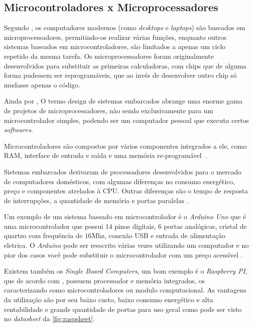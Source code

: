 \subsection{Microcontroladores x Microprocessadores}
\label{Sect:Micros}


Segundo , os computadores modernos (como \textit{desktops} e \textit{laptops}) são baseados em microprocessadores, permitindo-os realizar várias funções, enquanto outros sistemas baseados em microcontroladores, são limitados a apenas um ciclo repetido da mesma tarefa. Os microprocessadores foram originalmente desenvolvidos para substituir as primeiras calculadoras, com chips que de alguma forma pudessem ser reprogramáveis, que ao invés de desenvolver outro chip só mudasse apenas o código.

Ainda por , O termo design de sistemas embarcados abrange uma enorme gama de projetos de microprocessadores, não sendo exclusivamente para um microcontrolador simples, podendo ser um computador pessoal que executa certos \textit{softwares}.\par Microcontroladores são compostos por vários componentes integrados a ele, como RAM, interface de entrada e saída e uma memória re-programável~\cite{white:2011}.


Sistemas embarcados derivaram de processadores desenvolvidos para o mercado de computadores domésticos, com algumas diferenças no consumo energético, preço e componentes atrelados à CPU. Outras diferenças são o tempo de resposta de interrupções, a quantidade de memória e portas paralelas \cite{schlett:1998}.

Um exemplo de um sistema baseado em microcontrolador é o \textit{Arduino Uno} \cite{Arduino2018ArduinoRev3} que é uma microcontrolador que possui $14$ pinos digitais, $6$ portas analógicas, cristal de quartzo com frequência de $16$Mhz, conexão USB e entrada de alimentação eletrica. O \textit{Arduino} pode ser reescrito várias vezes utilizando um computador e no pior dos casos você pode substituir o microcontrolador com um preço acessível \cite{Arduino2018ArduinoRev3}.


Existem também os \textit{Single Board Computers}, um bom exemplo é o \textit{Raspberry PI}, que de acordo com , possuem processador e memória integrados, os caracterizando como microcontroladores ou modulo computacional. As vantagens da utilização são por seu baixo custo, baixo consumo energético e alta rentabilidade e grande quantidade de portas para uso geral como pode ser visto no \textit{datasheet} da \autoref{fig:raspsheet}. 


